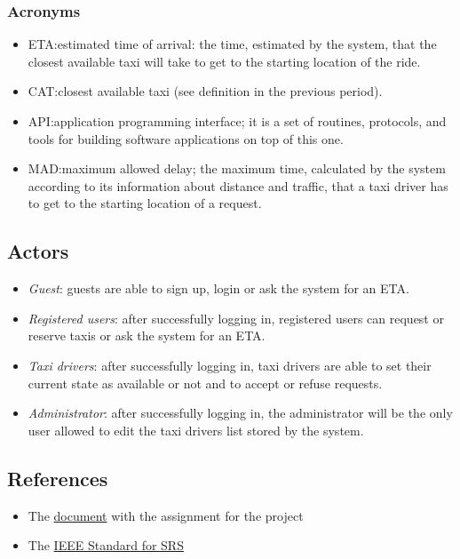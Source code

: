 \documentclass{article}
\begin{document}
\subsubsection{Acronyms}
\begin{itemize}
	\item ETA:\@ estimated time of arrival: the time, estimated by the system, that the closest available taxi will take to get to the starting location of the ride.
	\item CAT:\@ closest available taxi (see definition in the previous period).
	\item API:\@ application programming interface; it is a set of routines, protocols, and tools for building software applications on top of this one.
	\item MAD:\@ maximum allowed delay; the maximum time, calculated by the system according to its information about distance and traffic, that a taxi driver has to get to the starting location of a request. 
\end{itemize}
\subsection{Actors}
\begin{itemize}
	\item \textit{Guest}: guests are able to sign up, login or ask the system for an ETA.\@
	\item \textit{Registered users}: after successfully logging in, registered users can request or reserve taxis or ask the system for an ETA.\@
	\item \textit{Taxi drivers}: after successfully logging in, taxi drivers are able to set their current state as available or not and to accept or refuse requests.
	\item \textit{Administrator}: after successfully logging in, the administrator will be the only user allowed to edit the taxi drivers list stored by the system.
\end{itemize}

\subsection{References}
\begin{itemize}
	\item The \href{run:./external_references/assignments.pdf}{document} with the assignment for the project
	\item The \href{run:./external_references/assignments.pdf}{IEEE Standard for SRS } 
\end{itemize}
\end{document}
